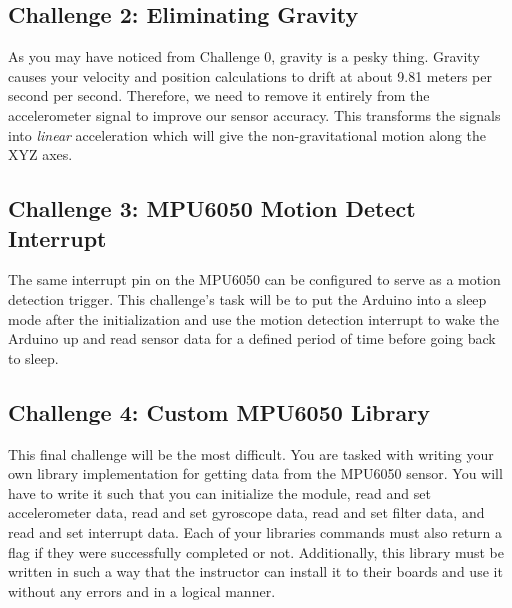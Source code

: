     \subsection*{Challenge 2: Eliminating Gravity}
    As you may have noticed from Challenge 0, gravity is a pesky thing.
    Gravity causes your velocity and position calculations to drift at about 9.81 meters per second per second.
    Therefore, we need to remove it entirely from the accelerometer signal to improve our sensor accuracy.
    This transforms the signals into \textit{linear} acceleration which will give the non-gravitational motion along the XYZ axes.

    \subsection*{Challenge 3: MPU6050 Motion Detect Interrupt}
    The same interrupt pin on the MPU6050 can be configured to serve as a motion detection trigger.
    This challenge's task will be to put the Arduino into a sleep mode after the initialization and use the motion detection interrupt to wake the Arduino up and read sensor data for a defined period of time before going back to sleep.
    
    \subsection*{Challenge 4: Custom MPU6050 Library}
    This final challenge will be the most difficult. You are tasked with writing your own library implementation for getting data from the MPU6050 sensor.
    You will have to write it such that you can initialize the module, read and set accelerometer data, read and set gyroscope data, read and set filter data, and read and set interrupt data.
    Each of your libraries commands must also return a flag if they were successfully completed or not.
    Additionally, this library must be written in such a way that the instructor can install it to their boards and use it without any errors and in a logical manner.
